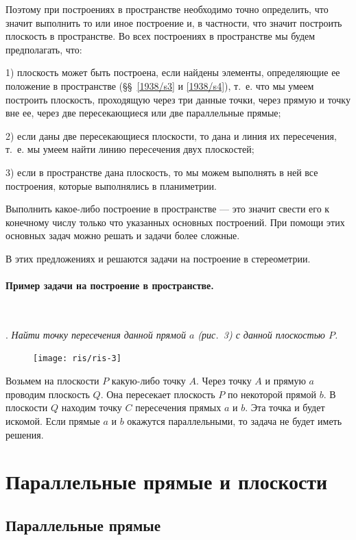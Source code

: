 \documentclass[twoside]{book}
\begin{document}
Поэтому при построениях в пространстве необходимо точно {определить, что значит выполнить то или иное построение} и, в частности, что значит построить плоскость в пространстве.
Во всех построениях в пространстве мы будем предполагать, что:

1) плоскость может быть построена, если найдены элементы, определяющие ее положение в пространстве (§§~\ref{1938/s3} и \ref{1938/s4}), т.~е. что мы умеем построить плоскость, проходящую через три данные точки, через прямую и точку вне ее, через две пересекающиеся или две параллельные прямые;

2) если даны две пересекающиеся плоскости, то дана и линия их пересечения, т.~е. мы умеем найти линию пересечения двух плоскостей;

3) если в пространстве дана плоскость, то мы можем выполнять в ней все построения, которые выполнялись в планиметрии.

{Выполнить какое-либо построение в пространстве --- это значит свести его к конечному числу только что указанных основных построений.}
При помощи этих основных задач можно решать и задачи более сложные.

В этих предложениях и решаются задачи на построение в стереометрии.

\paragraph{Пример задачи на построение в пространстве.}\label{1938/s7}\ 

.
\emph{Найти точку пересечения данной прямой $a$ \emph{(рис.~3)} с данной плоскостью $P$.}

\begin{figure}[h!]
\centering
\texttt{[image: ris/ris-3]}
\caption{}
\end{figure} 

Возьмем на плоскости $P$ какую-либо точку $A$.
Через точку $A$ и прямую $a$ проводим плоскость $Q$.
Она пересекает плоскость $P$ по некоторой прямой $b$.
В плоскости $Q$ находим точку $C$ пересечения прямых $a$ и $b$.
Эта точка и будет искомой.
Если прямые $a$ и $b$ окажутся параллельными, то задача не будет иметь решения.



\section{Параллельные прямые и плоскости}

\subsection*{Параллельные прямые}
\end{document}
